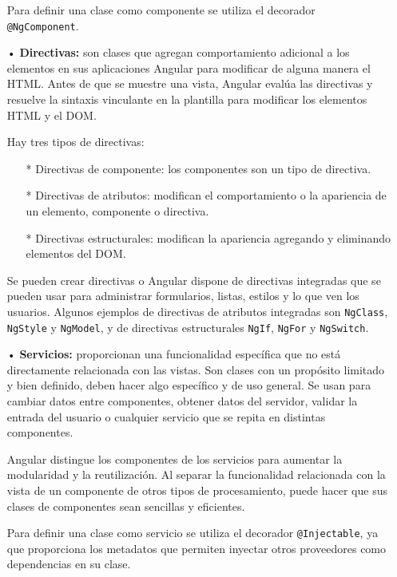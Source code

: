 \documentclass[a4paper, 12pt]{book}
\begin{document}
\begin{itemize}
	Para definir una clase como componente se utiliza el decorador \texttt{@NgComponent}.
	
	\item[•] \textbf{Directivas:} son clases que agregan comportamiento adicional a los elementos en sus aplicaciones Angular para modificar de alguna manera el HTML. 
	Antes de que se muestre una vista, Angular evalúa las directivas y resuelve la sintaxis vinculante en la plantilla para modificar los elementos HTML y el DOM.
	
	Hay tres tipos de directivas:
	
	\begin{itemize}
	\item[*] Directivas de componente: los componentes son un tipo de directiva.
	\item[*] Directivas de atributos: modifican el comportamiento o la apariencia de un elemento, componente o directiva.
	\item[*] Directivas estructurales: modifican la apariencia agregando y eliminando elementos del DOM.
	\end{itemize}
	
	Se pueden crear directivas o Angular dispone de directivas integradas que se pueden usar para administrar formularios, listas, estilos y lo que ven los usuarios. 
	Algunos ejemplos de directivas de atributos integradas son \texttt{NgClass}, \texttt{NgStyle} y \texttt{NgModel}, y de directivas estructurales \texttt{NgIf}, \texttt{NgFor} y \texttt{NgSwitch}.
	
	\item[•] \textbf{Servicios:} proporcionan una funcionalidad específica que no está directamente relacionada con las vistas. Son clases con un propósito limitado y bien definido, deben hacer algo específico y de uso general. 
	Se usan para cambiar datos entre componentes, obtener datos del servidor, validar la entrada del usuario o cualquier servicio que se repita en distintas componentes.
	
	Angular distingue los componentes de los servicios para aumentar la modularidad y la reutilización. 
	Al separar la funcionalidad relacionada con la vista de un componente de otros tipos de procesamiento, puede hacer que sus clases de componentes sean sencillas y eficientes.
	
	Para definir una clase como servicio se utiliza el decorador \texttt{@Injectable}, ya que proporciona los metadatos que permiten inyectar otros proveedores como dependencias en su clase.
	
\end{itemize}
\end{document}
